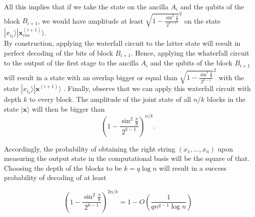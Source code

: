 \documentclass{article}
\theoremstyle{definition}
\newcommand{\ket}[1]{|#1\rangle}
\begin{document}
All this implies that if we take the state on the ancilla $A_i$ and the qubits of the block $B_{i+1}$, we would have amplitude at least $ \sqrt{1-\frac{\sin^2\frac{\pi}{8}}{2^{k-1}}}^2$ on the state $\ket{x_{i_k}}\ket{\textbf{x}^{(i+1)}_{enc}}$.\\

By construction, applying the waterfall circuit to the latter state will result in perfect decoding of the bits of block $B_{i+1}$. Hence, applying the whaterfall circuit to the output of the first stage to the ancilla $A_i$ and the qubits of the block $B_{i+1}$ will result in a state with an overlap bigger or equal than $\sqrt{1-\frac{\sin^2\frac{\pi}{8}}{2^{k-1}}}^2$ with the state $\ket{x_{i_k}}\ket{\textbf{x}^{(i+1)}}$ . Finally, observe that we can apply this waterfall circuit with depth $k$ to every block. The amplitude of the  joint state of all $n/k$ blocks in the state $\ket{\textbf{x}}$ will then be bigger than
\begin{equation}
 \left(1-\frac{\sin^2\frac{\pi}{8}}{2^{k-1}}\right)^{n/k}.
\end{equation}

Accordingly, the probability of obtaining the right string $(x_1,\dots,x_n)$ upon measuring the output state in the computational basis will be the square of that. Choosing the depth of the blocks to be $k=q\log n$ will result in a success probability of decoding of at least

\begin{equation}
 \left(1-\frac{\sin^2\frac{\pi}{8}}{2^{k-1}}\right)^{2n/k}=1-O\left(\frac{1}{qn^{q-1}\log n}\right)
\end{equation}
\end{document}
